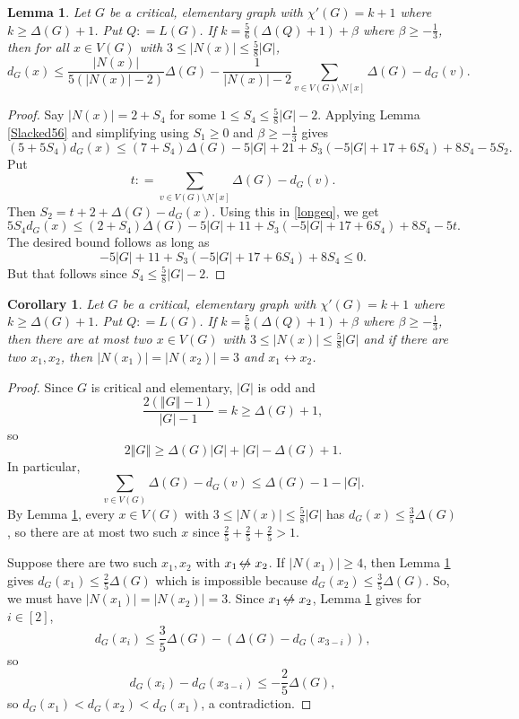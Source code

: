 \documentclass[12pt]{amsart}
\theoremstyle{plain}
\newtheorem{lem}[thm]{Lemma}
\newtheorem{cor}[thm]{Corollary}
\theoremstyle{definition}
\theoremstyle{remark}
\newcommand{\card}[1]{\left|#1\right|}
\newcommand{\size}[1]{\left\Vert#1\right\Vert}
\newcommand{\irange}[1]{\left[#1\right]}
\newcommand{\parens}[1]{\left( #1 \right)}
\newcommand{\DefinedAs}{\mathrel{\mathop:}=}
\def\adj{\leftrightarrow}
\def\nonadj{\not\!\leftrightarrow}
\begin{document}
\begin{lem}\label{DegreeBoundedForMiddling}
Let $G$ be a critical, elementary graph with $\chi'(G) = k + 1$ where $k \ge \Delta(G) + 1$.  Put $Q \DefinedAs L(G)$. 
If $k = \frac56\parens{\Delta(Q) + 1} + \beta$ where $\beta \ge -\frac13$, then for all $x \in V(G)$ with $3 \le \card{N(x)} \le \frac58\card{G}$,
\[d_G(x) \le \frac{\card{N(x)}}{5\parens{\card{N(x)} - 2}}\Delta(G) - \frac{1}{\card{N(x)} - 2}\sum_{v \in V(G)\setminus N[x]} \Delta(G) - d_G(v).\]
\end{lem}
\begin{proof}
Say $|N(x)| = 2 + S_4$ for some $1 \le S_4 \le \frac58\card{G} - 2$.  Applying Lemma \ref{Slacked56} and simplifying using $S_1 \ge 0$ and $\beta \ge -\frac13$ gives
\begin{equation}\label{longeq}
(5+5S_4)d_G(x) \le (7 + S_4)\Delta(G) - 5|G| + 21 + S_3(-5|G| + 17 + 6S_4) + 8S_4 - 5S_2.
\end{equation}
Put 
\[t \DefinedAs \sum_{v \in V(G) \setminus N[x]} \Delta(G) - d_G(v).\]
Then $S_2 = t + 2 + \Delta(G) - d_G(x)$.  Using this in \eqref{longeq}, we get
\begin{equation}\label{longeq2}
5S_4d_G(x) \le (2 + S_4)\Delta(G) - 5|G| + 11 + S_3(-5|G| + 17 + 6S_4) + 8S_4 - 5t.
\end{equation}
The desired bound follows as long as
\[- 5|G| + 11 + S_3(-5|G| + 17 + 6S_4) + 8S_4 \le 0.\]
But that follows since $S_4 \le \frac58\card{G} - 2$.
\end{proof}

\begin{cor}
Let $G$ be a critical, elementary graph with $\chi'(G) = k + 1$ where $k \ge \Delta(G) + 1$.  Put $Q \DefinedAs L(G)$. 
If $k = \frac56\parens{\Delta(Q) + 1} + \beta$ where $\beta \ge -\frac13$, then there are at most two $x \in V(G)$ with $3 \le \card{N(x)} \le \frac58\card{G}$
and if there are two $x_1, x_2$, then $\card{N(x_1)} = \card{N(x_2)} = 3$ and $x_1 \adj x_2$.
\end{cor}
\begin{proof}
Since $G$ is critical and elementary, $\card{G}$ is odd and
\[\frac{2(\size{G} - 1)}{\card{G} - 1} = k \ge \Delta(G) + 1,\]
so
\[2\size{G} \ge \Delta(G)\card{G} + \card{G} - \Delta(G) + 1.\]
In particular,
\[\sum_{v \in V(G)} \Delta(G) - d_G(v) \le \Delta(G) - 1 - \card{G}.\]
By Lemma \ref{DegreeBoundedForMiddling}, every $x \in V(G)$ with $3 \le \card{N(x)} \le \frac58\card{G}$ has $d_G(x) \le \frac35\Delta(G)$, so there are at most two such $x$ since
$\frac25 + \frac25 + \frac25 > 1$.

Suppose there are two such $x_1, x_2$ with $x_1 \nonadj x_2$.  If $\card{N(x_1)} \ge 4$, then Lemma \ref{DegreeBoundedForMiddling} gives $d_G(x_1) \le \frac25\Delta(G)$ which is impossible because $d_G(x_2) \le \frac35\Delta(G)$.  So, we must have $\card{N(x_1)} = \card{N(x_2)} = 3$.  Since $x_1 \nonadj x_2$, Lemma \ref{DegreeBoundedForMiddling} gives for $i \in \irange{2}$,
\[d_G(x_i) \le \frac35\Delta(G) - (\Delta(G) - d_G(x_{3-i})),\]
so
\[d_G(x_i) - d_G(x_{3-i}) \le -\frac25\Delta(G),\]
so $d_G(x_1) < d_G(x_2) < d_G(x_1)$, a contradiction.
\end{proof}
\end{document}
